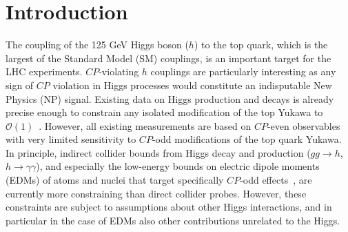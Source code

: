 \documentclass[11pt,a4paper]{article}
\begin{document}
\section{Introduction}
%
The coupling of the 125 GeV Higgs boson ($h$) to the top quark, which is the largest of the Standard Model (SM) couplings, is an important target for the LHC experiments. $CP$-violating $h$ couplings are particularly interesting as any sign of $CP$ violation in Higgs processes would constitute an indisputable New Physics (NP) signal. Existing data on Higgs production and decays is already precise enough to constrain any isolated modification of the top Yukawa to $\mathcal O(1)$~\cite{Ellis:2013yxa,Khachatryan:2016vau,Bhattacharyya:2012tj}. However, all existing measurements are based on $CP$-even observables with very limited sensitivity to $CP$-odd modifications of the top quark Yukawa. In principle, indirect collider bounds from Higgs decay and production ($gg \to h$, $h \to \gamma\gamma$), and especially the low-energy bounds on electric dipole moments (EDMs) of atoms and nuclei that target specifically $CP$-odd effects~\cite{Brod:2013cka,Ellis:2013yxa,Boudjema:2015nda}, are currently more constraining than direct collider probes. However, these constraints are subject to assumptions about other Higgs interactions, and in particular in the case of EDMs also other contributions unrelated to the Higgs.
\end{document}
